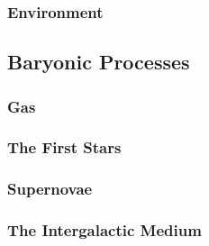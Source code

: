 \subsubsection{Environment}
\label{subsubsec:environment}




\subsection{Baryonic Processes}
\label{subsec:baryonic_processes}



\subsubsection{Gas}
\label{subsubsec:gas}



\subsubsection{The First Stars}
\label{subsubsec:first_stars}



\subsubsection{Supernovae}
\label{subsubsec:supernovae}



\subsubsection{The Intergalactic Medium}
\label{subsubsec:igm}



